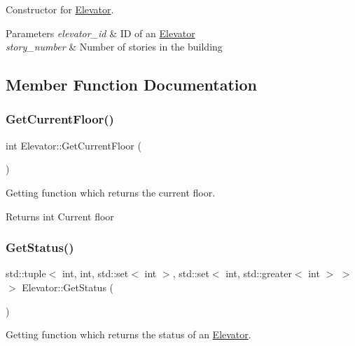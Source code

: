 Constructor for \mbox{\hyperlink{class_elevator}{Elevator}}. 


\begin{DoxyParams}{Parameters}
{\em elevator\+\_\+id} & ID of an \mbox{\hyperlink{class_elevator}{Elevator}} \\
\hline
{\em story\+\_\+number} & Number of stories in the building \\
\hline
\end{DoxyParams}


\subsection{Member Function Documentation}
\mbox{\label{class_elevator_afb9234ed92da547473353a8c95e64d4a}} 
\subsubsection{\texorpdfstring{Get\+Current\+Floor()}{GetCurrentFloor()}}
{\footnotesize\ttfamily int Elevator\+::\+Get\+Current\+Floor (\begin{DoxyParamCaption}{ }\end{DoxyParamCaption})}



Getting function which returns the current floor. 

\begin{DoxyReturn}{Returns}
int Current floor 
\end{DoxyReturn}
\mbox{\label{class_elevator_af12cb808503563d585d4851f341b5164}} 
\subsubsection{\texorpdfstring{Get\+Status()}{GetStatus()}}
{\footnotesize\ttfamily std\+::tuple$<$ int, int, std\+::set$<$ int $>$, std\+::set$<$ int, std\+::greater$<$ int $>$ $>$ $>$ Elevator\+::\+Get\+Status (\begin{DoxyParamCaption}{ }\end{DoxyParamCaption})}



Getting function which returns the status of an \mbox{\hyperlink{class_elevator}{Elevator}}. 

